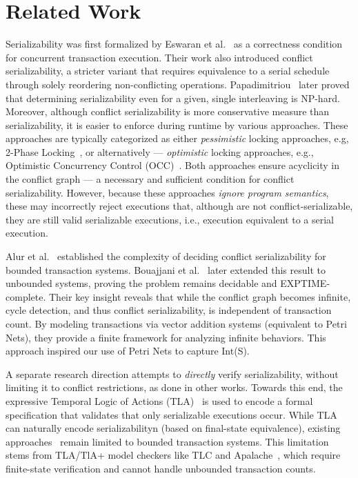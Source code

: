 \section{Related Work}
\label{sec:relatedWork}

Serializability was first formalized by Eswaran et al.~\cite{EsGrKoTr76} as a correctness condition for concurrent transaction execution. Their work also introduced conflict serializability, a stricter variant that requires equivalence to a serial schedule through solely reordering non-conflicting operations. Papadimitriou~\cite{Pa79} later proved that determining serializability even for a given, single interleaving is NP-hard. 
%
Moreover, although conflict serializability is more conservative measure than serializability, it is easier to enforce during runtime by various approaches. 
%
These approaches are typically categorized as either \textit{pessimistic} locking approaches, e.g, 2-Phase Locking~\cite{BeHaGo87}, or alternatively --- \textit{optimistic} locking approaches, e.g., Optimistic Concurrency Control (OCC)~\cite{KuRo81, BuMo06}.
%
Both approaches ensure acyclicity in the conflict graph --- a necessary and sufficient  condition for conflict serializability. However, because these approaches \textit{ignore program semantics}, these may incorrectly reject executions that, although are not conflict-serializable, they are still valid serializable executions, i.e., execution equivalent to a serial execution.
%

Alur et al.~\cite{AlMcPe96} established the complexity of deciding conflict serializability for bounded transaction systems. Bouajjani et al.~\cite{BoEmEnHa13} later extended this result to unbounded systems, proving the problem remains decidable and EXPTIME-complete. Their key insight reveals that while the conflict graph becomes infinite, cycle detection, and thus conflict serializability, is independent of transaction count. By modeling transactions via vector addition systems (equivalent to Petri Nets), they provide a finite framework for analyzing infinite behaviors. This approach inspired our use of Petri Nets to capture Int(S). 

A separate research direction attempts to \textit{directly} verify serializability, without limiting it to conflict restrictions, as done in other works. Towards this end, the expressive Temporal Logic of Actions (TLA)~\cite{La94} is used to encode a formal specification that validates that only serializable executions occur. While TLA can naturally encode serializabilityn (based on final-state equivalence), existing approaches~\cite{SoVaVi20, Ho24} remain limited to bounded transaction systems. This limitation stems from TLA/TlA+ model checkers like TLC and Apalache~\cite{YuMaLa99, KoKuTr19}, which require finite-state verification and cannot handle unbounded transaction counts.

